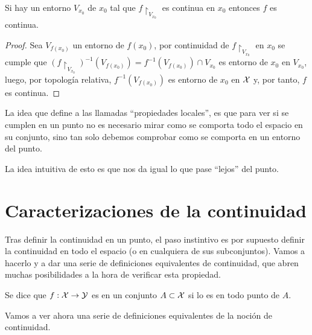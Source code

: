 \begin{prop} Si hay un entorno $V_{x_0}$ de $x_0$ tal que $f\restriction_{V_{x_0}}$ es continua en $x_0$ entonces $f$ es continua.
	
	\begin{proof}
		Sea $V_{f(x_0)}$ un entorno de $f(x_0)$, por continuidad de  $f\restriction_{V_{x_0}}$ en $x_0$ se cumple que $(f\restriction_{V_{x_0}})^{-1}(V_{f(x_0)}) = f^{-1}(V_{f(x_0)})\cap V_{x_0}$ es entorno de $x_0$ en $V_{x_0}$, luego, por topología relativa, $f^{-1}(V_{f(x_0)})$ es entorno de $x_0$ en $\mathcal{X}$ y, por tanto, $f$ es continua.
	\end{proof}
\end{prop}

	La idea que define a las llamadas ``propiedades locales'', es que para ver si se cumplen en un punto no es necesario mirar como se comporta todo el espacio en su conjunto, sino tan solo debemos comprobar como se comporta en un entorno del punto.
	
	La idea intuitiva de esto es que nos da igual lo que pase ``lejos'' del punto.

\section{Caracterizaciones de la continuidad}

Tras definir la continuidad en un punto, el paso instintivo es por supuesto definir la continuidad en todo el espacio (o en cualquiera de sus subconjuntos). Vamos a hacerlo y a dar una serie de definiciones equivalentes de continuidad, que abren muchas posibilidades a la hora de verificar esta propiedad.

\begin{defi}
	Se dice que $f:\mathcal{X}\to\mathcal{Y}$ es  en un conjunto $A\subset \mathcal{X}$ si lo es en todo punto de $A$.
\end{defi}

Vamos a ver ahora una serie de definiciones equivalentes de la noción de continuidad.

